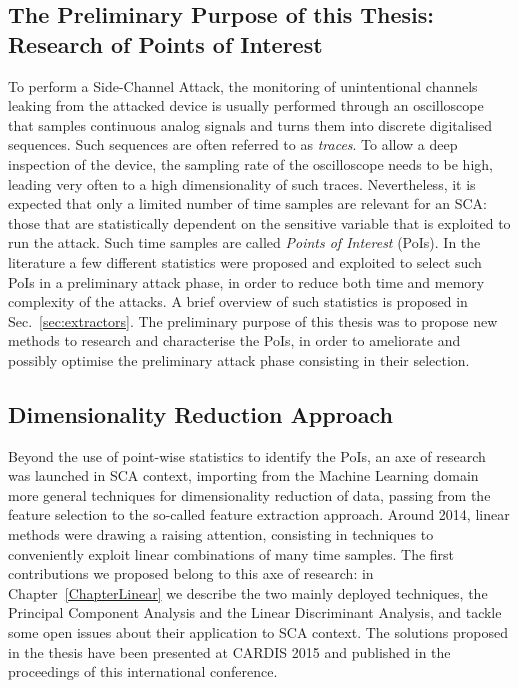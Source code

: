 \subsection{The Preliminary Purpose of this Thesis: Research of Points of Interest}\label{sec:foreword}
To perform a Side-Channel Attack, the monitoring of unintentional channels leaking from the attacked device is usually performed through an oscilloscope that samples continuous analog signals and turns them into discrete digitalised sequences. Such sequences are often referred to as \emph{traces}. To allow a deep inspection of the device, the sampling rate of the oscilloscope needs to be high, leading very often to a high dimensionality of such traces. Nevertheless,  it is expected that only a limited number of time samples are relevant for an SCA: those that are statistically dependent on the sensitive variable that is exploited to run the attack. Such time samples are called \emph{Points of Interest} (PoIs). In the literature a few different statistics were proposed and exploited to select such PoIs in a preliminary attack phase, in order to reduce both time and memory complexity of the attacks. A brief overview of such statistics is proposed in Sec.~\ref{sec:extractors}. The preliminary purpose of this thesis was to propose new methods to research and characterise the PoIs, in order to ameliorate and possibly optimise the preliminary attack phase consisting in their selection. 

\subsection{Dimensionality Reduction Approach}\label{sec:dim_red_objective}
Beyond the use of point-wise statistics to identify the PoIs, an axe of research was launched in SCA context, importing from the Machine Learning domain more general techniques for dimensionality reduction of data, passing from the feature selection to the so-called feature extraction approach. Around 2014, linear methods were drawing a raising attention, consisting in techniques to conveniently exploit linear combinations of many time samples. The first contributions we proposed belong to this axe of research: in Chapter~\ref{ChapterLinear} we describe the two mainly deployed techniques, the Principal Component Analysis and the Linear Discriminant Analysis, and tackle some open issues about their application to SCA context. The solutions proposed in the thesis have been presented at CARDIS 2015 \cite{Cagli2016} and published in the proceedings of this international conference.\\

